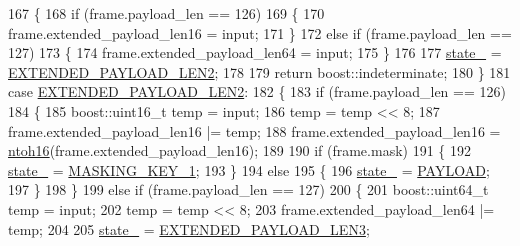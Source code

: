 \begin{DoxyCode}
167             \{
168                 \textcolor{keywordflow}{if} (frame.payload\_len == 126)
169                 \{
170                     frame.extended\_payload\_len16 = input;
171                 \}
172                 \textcolor{keywordflow}{else} \textcolor{keywordflow}{if} (frame.payload\_len == 127)
173                 \{
174                     frame.extended\_payload\_len64 = input;
175                 \}
176 
177                 \hyperlink{classwebsocket_1_1DataframeParser_a46525ab8a38ba649b49faa6bf3b0c959}{state\_} = \hyperlink{classwebsocket_1_1DataframeParser_a2285d0f76dcfd6dadbe70a78c5e3de8aabc3d01e63f47e768f18b8663e810eac8}{EXTENDED\_PAYLOAD\_LEN2};
178 
179                 \textcolor{keywordflow}{return} boost::indeterminate;
180             \}
181         \textcolor{keywordflow}{case} \hyperlink{classwebsocket_1_1DataframeParser_a2285d0f76dcfd6dadbe70a78c5e3de8aabc3d01e63f47e768f18b8663e810eac8}{EXTENDED\_PAYLOAD\_LEN2}:
182             \{
183                 \textcolor{keywordflow}{if} (frame.payload\_len == 126)
184                 \{
185                     boost::uint16\_t temp = input;
186                     temp = temp << 8;
187                     frame.extended\_payload\_len16 |= temp;
188                     frame.extended\_payload\_len16 = \hyperlink{classwebsocket_1_1DataframeParser_abfb0ab043395dd9d4ce1506a792343db}{ntoh16}(frame.extended\_payload\_len16);
189 
190                     \textcolor{keywordflow}{if} (frame.mask)
191                     \{
192                         \hyperlink{classwebsocket_1_1DataframeParser_a46525ab8a38ba649b49faa6bf3b0c959}{state\_} = \hyperlink{classwebsocket_1_1DataframeParser_a2285d0f76dcfd6dadbe70a78c5e3de8aa3b69744b62fa835db0824373457b6434}{MASKING\_KEY\_1};
193                     \}
194                     \textcolor{keywordflow}{else}
195                     \{
196                         \hyperlink{classwebsocket_1_1DataframeParser_a46525ab8a38ba649b49faa6bf3b0c959}{state\_} = \hyperlink{classwebsocket_1_1DataframeParser_a2285d0f76dcfd6dadbe70a78c5e3de8aa598aa8acb047115c40ad5a8e4dbafa84}{PAYLOAD};
197                     \}
198                 \}
199                 \textcolor{keywordflow}{else} \textcolor{keywordflow}{if} (frame.payload\_len == 127)
200                 \{
201                     boost::uint64\_t temp = input;
202                     temp = temp << 8;
203                     frame.extended\_payload\_len64 |= temp;
204 
205                     \hyperlink{classwebsocket_1_1DataframeParser_a46525ab8a38ba649b49faa6bf3b0c959}{state\_} = \hyperlink{classwebsocket_1_1DataframeParser_a2285d0f76dcfd6dadbe70a78c5e3de8aa3378e509de505a563f329a988e7b25e5}{EXTENDED\_PAYLOAD\_LEN3};

\end{DoxyCode}
